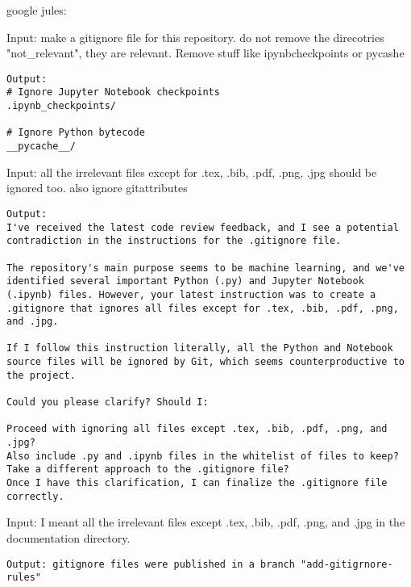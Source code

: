 \documentclass{article}
\begin{document}
google jules:

Input: make a gitignore file for this repository. do not remove the direcotries "not\_relevant", they are relevant. Remove stuff like ipynbcheckpoints or pycashe
\begin{verbatim}
Output:
# Ignore Jupyter Notebook checkpoints
.ipynb_checkpoints/

# Ignore Python bytecode
__pycache__/
\end{verbatim}
Input: all the irrelevant files except for .tex, .bib, .pdf, .png, .jpg should be ignored too. also ignore gitattributes
\begin{verbatim}
Output: 
I've received the latest code review feedback, and I see a potential contradiction in the instructions for the .gitignore file.

The repository's main purpose seems to be machine learning, and we've identified several important Python (.py) and Jupyter Notebook (.ipynb) files. However, your latest instruction was to create a .gitignore that ignores all files except for .tex, .bib, .pdf, .png, and .jpg.

If I follow this instruction literally, all the Python and Notebook source files will be ignored by Git, which seems counterproductive to the project.

Could you please clarify? Should I:

Proceed with ignoring all files except .tex, .bib, .pdf, .png, and .jpg?
Also include .py and .ipynb files in the whitelist of files to keep?
Take a different approach to the .gitignore file?
Once I have this clarification, I can finalize the .gitignore file correctly.
\end{verbatim}
Input: I meant all the irrelevant files except .tex, .bib, .pdf, .png, and .jpg in the documentation directory.
\begin{verbatim}
Output: gitignore files were published in a branch "add-gitigrnore-rules"
\end{verbatim}
\end{document}

